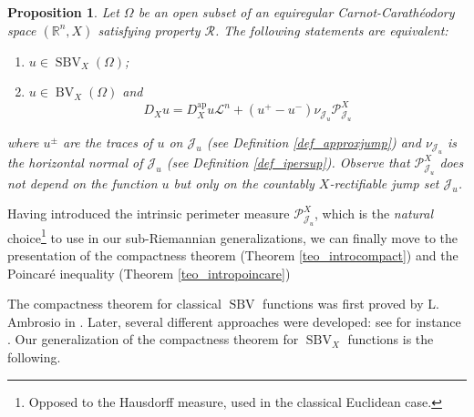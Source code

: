 \documentclass[12pt,a4paper]{amsart}
\theoremstyle{definition}
\theoremstyle{plain}
\newtheorem{pro}[defi]{Proposition}
\newcommand{\R}{\mathbb{R}}
\newcommand{\pxu}{{\mathcal{P}^X_{\mathcal{J}_u}}}
\newcommand{\leb}{\mathcal{L}}
\newcommand{\sbv}{\operatorname{SBV}}
\newcommand{\bv}{\operatorname{BV}}
\newcommand{\J}{\mathcal{J}}
\newcommand{\ap}{{\operatorname{ap}}}
\begin{document}
\begin{pro} Let $\Omega$ be an open subset of an equiregular Carnot-Carathéodory space $(\R^n,X)$ satisfying property $\mathcal R$. The following statements are equivalent:
    \begin{enumerate}
        \item[(i)] $u\in \sbv_X(\Omega)$;
        \item[(ii)] $u\in \bv_X(\Omega)$ and  
        \[
        D_Xu= D^\ap_Xu \leb^n+(u^+-u^-)\nu_{\J_u}\pxu
        \]
    \end{enumerate}
    where $u^\pm$ are the traces of $u$ on $\J_u$ (see Definition \ref{def_approxjump}) and $\nu_{\J_u}$ is the \emph{horizontal normal} of $\J_u$ (see Definition \ref{def_ipersup}). Observe that $\pxu$ does not depend on the function $u$ but only on the countably $X$-rectifiable jump set $\J_u$. 
\end{pro}


Having introduced the intrinsic perimeter measure $\pxu$, which is the \emph{natural} choice\footnote{Opposed to the Hausdorff measure, used in the classical Euclidean case.} to use in our sub-Riemannian generalizations, we can finally move to the presentation of the compactness theorem (Theorem \ref{teo_introcompact}) and the Poincaré inequality (Theorem \ref{teo_intropoincare})


The compactness theorem for classical $\sbv$ functions was first proved by L. Ambrosio in \cite{ambrosio89}. Later, several different approaches were developed: see for instance \cite{ambrosio95,albertimantegazza}. Our generalization of the compactness theorem for $\sbv_X$ functions is the following. 
\end{document}
